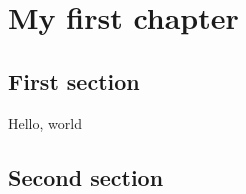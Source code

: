 \documentclass[12pt, a4paper, oneside, openright]{scrbook}
\begin{document}
    \tableofcontents

    \chapter{My first chapter}
    \section{First section}
        Hello, world
    
    \section{Second section}
\end{document}
